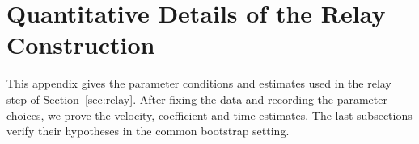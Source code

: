 \section{Quantitative Details of the Relay Construction}
\label{sec:construction-details}

This appendix gives the parameter conditions and estimates used in the
relay step of Section~\ref{sec:relay}. After fixing the data and recording the
parameter choices, we prove the velocity, coefficient and time estimates.
The last subsections verify their hypotheses in the common bootstrap setting.





